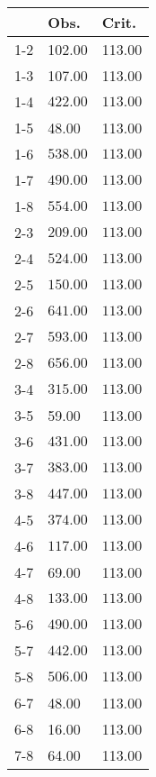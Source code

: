 \begin{table}[ht]
\centering
\begin{tabular}{rll}
  \hline
 & Obs. & Crit. \\ 
  \hline
1-2 & 102.00 & 113.00 \\ 
  1-3 & 107.00 & 113.00 \\ 
  1-4 & \(\mathbf{422.00}\) & \(\mathbf{113.00}\) \\ 
  1-5 & 48.00 & 113.00 \\ 
  1-6 & \(\mathbf{538.00}\) & \(\mathbf{113.00}\) \\ 
  1-7 & \(\mathbf{490.00}\) & \(\mathbf{113.00}\) \\ 
  1-8 & \(\mathbf{554.00}\) & \(\mathbf{113.00}\) \\ 
  2-3 & \(\mathbf{209.00}\) & \(\mathbf{113.00}\) \\ 
  2-4 & \(\mathbf{524.00}\) & \(\mathbf{113.00}\) \\ 
  2-5 & \(\mathbf{150.00}\) & \(\mathbf{113.00}\) \\ 
  2-6 & \(\mathbf{641.00}\) & \(\mathbf{113.00}\) \\ 
  2-7 & \(\mathbf{593.00}\) & \(\mathbf{113.00}\) \\ 
  2-8 & \(\mathbf{656.00}\) & \(\mathbf{113.00}\) \\ 
  3-4 & \(\mathbf{315.00}\) & \(\mathbf{113.00}\) \\ 
  3-5 & 59.00 & 113.00 \\ 
  3-6 & \(\mathbf{431.00}\) & \(\mathbf{113.00}\) \\ 
  3-7 & \(\mathbf{383.00}\) & \(\mathbf{113.00}\) \\ 
  3-8 & \(\mathbf{447.00}\) & \(\mathbf{113.00}\) \\ 
  4-5 & \(\mathbf{374.00}\) & \(\mathbf{113.00}\) \\ 
  4-6 & \(\mathbf{117.00}\) & \(\mathbf{113.00}\) \\ 
  4-7 & 69.00 & 113.00 \\ 
  4-8 & \(\mathbf{133.00}\) & \(\mathbf{113.00}\) \\ 
  5-6 & \(\mathbf{490.00}\) & \(\mathbf{113.00}\) \\ 
  5-7 & \(\mathbf{442.00}\) & \(\mathbf{113.00}\) \\ 
  5-8 & \(\mathbf{506.00}\) & \(\mathbf{113.00}\) \\ 
  6-7 & 48.00 & 113.00 \\ 
  6-8 & 16.00 & 113.00 \\ 
  7-8 & 64.00 & 113.00 \\ 
   \hline
\end{tabular}
\end{table}
